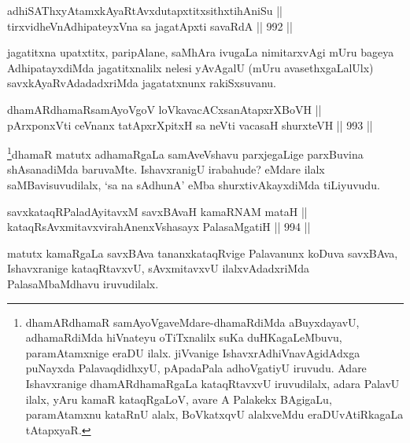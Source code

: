 \begin{shl}
adhiSAThxyA\s \s tamxkAyaRtAvxdutapxtitxsithxtihAniSu || \\
tirxvidheVnA\s \s dhipateyxVna sa jagatApxti savaRdA \hfill || 992 ||  
\end{shl}

\begin{artha}
jagatitxna upatxtitx, paripAlane, saMhAra ivugaLa nimitarxvAgi mUru bageya AdhipatayxdiMda jagatitxnalilx nelesi yAvAgalU (mUru avasethxgaLalUlx) savxkAyaRvAdadadxriMda jagatatxnunx rakiSxsuvanu.
\end{artha}


\begin{shl}
dhamARdhamaRsamAyoVgoV loVkavacACxsanAtapxrXBoVH || \\
pArxponxVti ceVnanx tatApxrXpitxH sa neVti vacasaH shurxteVH \hfill || 993 ||  
\end{shl}

\begin{artha}
\footnote[1]{dhamARdhamaR samAyoVgaveMdare-dhamaRdiMda aBuyxdayavU, adhamaRdiMda hiVnateyu oTiTxnalilx suKa duHKagaLeMbuvu, paramAtamxnige eraDU ilalx. jiVvanige IshavxrAdhiVnavAgidAdxga puNayxda PalavaqdidhxyU, pApadaPala adhoVgatiyU iruvudu. Adare Ishavxranige dhamARdhamaRgaLa kataqRtavxvU iruvudilalx, adara PalavU ilalx, yAru kamaR kataqRgaLoV, avare A Palakekx BAgigaLu, paramAtamxnu kataRnU alalx, BoVkatxqvU alalxveMdu eraDUvAtiRkagaLa tAtapxyaR.}dhamaR matutx adhamaRgaLa samAveVshavu parxjegaLige parxBuvina shAsanadiMda baruvaMte. IshavxranigU irabahude? eMdare ilalx saMBavisuvudilalx, `sa na sAdhunA' eMba shurxtivAkayxdiMda tiLiyuvudu.
\end{artha}

\begin{shl}
\footnotemark[2]savxkataqRPaladAyitavxM savxBAvaH kamaRNAM mataH || \\
kataqRsAvxmitavxvirahAnenxVshasayx PalasaMgatiH \hfill || 994 ||  
\end{shl}

\begin{artha}
matutx kamaRgaLa savxBAva tananxkataqRvige Palavanunx koDuva savxBAva, Ishavxranige kataqRtavxvU, sAvxmitavxvU ilalxvAdadxriMda PalasaMbaMdhavu iruvudilalx.
\end{artha}


